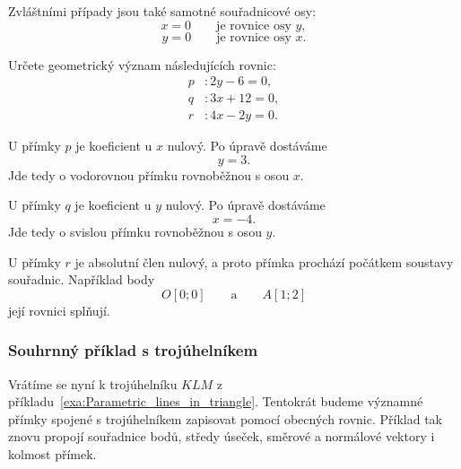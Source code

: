 Zvláštními případy jsou také samotné souřadnicové osy:
\[
    x=0
    \qquad\text{je rovnice osy }y,
\]
\[
    y=0
    \qquad\text{je rovnice osy }x.
\]

\begin{example}\label{exa:Special_general_line_equations}
    Určete geometrický význam následujících rovnic:
    \begin{align*}
        p &: 2y-6=0,\\
        q &: 3x+12=0,\\
        r &: 4x-2y=0.
    \end{align*}

    U přímky $p$ je koeficient u $x$ nulový. Po úpravě dostáváme
    \[
        y=3.
    \]
    Jde tedy o vodorovnou přímku rovnoběžnou s osou $x$.

    U přímky $q$ je koeficient u $y$ nulový. Po úpravě dostáváme
    \[
        x=-4.
    \]
    Jde tedy o svislou přímku rovnoběžnou s osou $y$.

    U přímky $r$ je absolutní člen nulový, a proto přímka prochází
    počátkem soustavy souřadnic. Například body
    \[
        O[0;0]
        \qquad\text{a}\qquad
        A[1;2]
    \]
    její rovnici splňují.
\end{example}

\subsubsection{Souhrnný příklad s trojúhelníkem}
\label{subsubsec:General_lines_triangle}

Vrátíme se nyní k trojúhelníku $KLM$ z příkladu~\ref{exa:Parametric_lines_in_triangle}. Tentokrát budeme významné
přímky spojené s trojúhelníkem zapisovat pomocí obecných rovnic.
Příklad tak znovu propojí souřadnice bodů, středy úseček, směrové
a normálové vektory i kolmost přímek.

